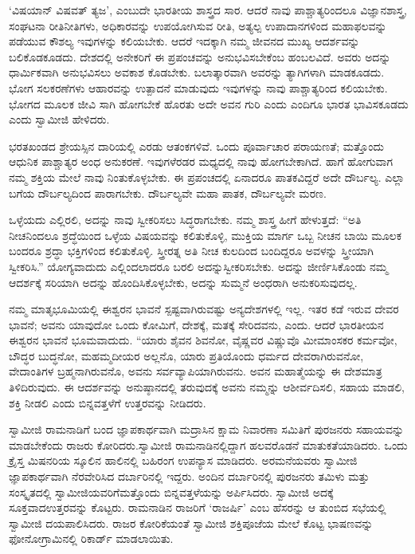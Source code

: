  ‘ವಿಷಯಾನ್ ವಿಷವತ್ ತ್ಯಜ’, ಎಂಬುದೇ ಭಾರತೀಯ ಶಾಸ್ತ್ರದ ಸಾರ. ಆದರೆ ನಾವು ಪಾಶ್ಚಾತ್ಯರಿಂದಲೂ ವಿಜ್ಞಾನಶಾಸ್ತ್ರ, ಸಂಘಟನಾ ರೀತಿನೀತಿಗಳು, ಅಧಿಕಾರವನ್ನು ಉಪಯೋಗಿಸುವ ರೀತಿ, ಅತ್ಯಲ್ಪ ಉಪಾದಾನಗಳಿಂದ ಮಹಾಫಲವನ್ನು ಪಡೆಯುವ ಕೌಶಲ್ಯ ಇವುಗಳನ್ನು ಕಲಿಯಬೇಕು. ಆದರೆ ಇದಕ್ಕಾಗಿ ನಮ್ಮ ಜೀವನದ ಮುಖ್ಯ ಆದರ್ಶವನ್ನು ಬಲಿಕೊಡಕೂಡದು. ದೇಶದಲ್ಲಿ ಅನೇಕರಿಗೆ ಈ ಪ್ರಪಂಚವನ್ನು ಅನುಭವಿಸಬೇಕೆಂಬ ಹಂಬಲವಿದೆ. ಅವರು ಅದನ್ನು ಧಾರ್ಮಿಕವಾಗಿ ಅನುಭವಿಸಲು ಅವಕಾಶ ಕೊಡಬೇಕು. ಬಲಾತ್ಕಾರವಾಗಿ ಅವರನ್ನು ತ್ಯಾಗಿಗಳಾಗಿ ಮಾಡಕೂಡದು. ಭೋಗ ಸಲಕರಣೆಗಳು ಆಹಾರವನ್ನು ಉತ್ಪಾದನೆ ಮಾಡುವುದು ಇವುಗಳನ್ನು ನಾವು ಪಾಶ್ಚಾತ್ಯರಿಂದ ಕಲಿಯಬೇಕು. ಭೋಗದ ಮೂಲಕ ಜೀವಿ ಸಾಗಿ ಹೋಗಬೇಕೆ ಹೊರತು ಅದೇ ಅವನ ಗುರಿ ಎಂದು ಎಂದಿಗೂ ಭಾರತ ಭಾವಿಸಕೂಡದು ಎಂದು ಸ್ವಾಮೀಜಿ ಹೇಳಿದರು. 

 ಭರತಖಂಡದ ಶ್ರೇಯಸ್ಸಿನ ದಾರಿಯಲ್ಲಿ ಎರಡು ಆತಂಕಗಳಿವೆ. ಒಂದು ಪೂರ್ವಾಚಾರ ಪರಾಯಣತೆ; ಮತ್ತೊಂದು ಆಧುನಿಕ ಪಾಶ್ಚಾತ್ಯರ ಅಂಧ ಅನುಕರಣೆ. ಇವುಗಳೆರಡರ ಮಧ್ಯದಲ್ಲಿ ನಾವು ಹೋಗಬೇಕಾಗಿದೆ. ಹಾಗೆ ಹೋಗುವಾಗ ನಮ್ಮ ಶಕ್ತಿಯ ಮೇಲೆ ನಾವು ನಿಂತುಕೊಳ್ಳಬೇಕು. ಈ ಪ್ರಪಂಚದಲ್ಲಿ ಏನಾದರೂ ಪಾತಕವಿದ್ದರೆ ಅದೇ ದೌರ್ಬಲ್ಯ. ಎಲ್ಲಾ ಬಗೆಯ ದೌರ್ಬಲ್ಯದಿಂದ ಪಾರಾಗಬೇಕು. ದೌರ್ಬಲ್ಯವೇ ಮಹಾ ಪಾತಕ, ದೌರ್ಬಲ್ಯವೇ ಮರಣ. 

 ಒಳ್ಳೆಯದು ಎಲ್ಲಿರಲಿ, ಅದನ್ನು ನಾವು ಸ್ವೀಕರಿಸಲು ಸಿದ್ಧರಾಗಬೇಕು. ನಮ್ಮ ಶಾಸ್ತ್ರ ಹೀಗೆ ಹೇಳುತ್ತದೆ: “ಅತಿ ನೀಚನಿಂದಲೂ ಶ್ರದ್ಧೆಯಿಂದ ಒಳ್ಳೆಯ ವಿಷಯವನ್ನು ಕಲಿತುಕೊಳ್ಳಿ, ಮುಕ್ತಿಯ ಮಾರ್ಗ ಒಬ್ಬ ನೀಚನ ಬಾಯಿ ಮೂಲಕ ಬಂದರೂ ಶ್ರದ್ಧಾ ಭಕ್ತಿಗಳಿಂದ ಕಲಿತುಕೊಳ್ಳಿ. ಸ್ತ್ರೀರತ್ನ ಅತಿ ನೀಚ ಕುಲದಿಂದ ಬಂದಿದ್ದರೂ ಅವಳನ್ನು ಸ್ತ್ರೀಯಾಗಿ ಸ್ವೀಕರಿಸಿ.” ಯೋಗ್ಯವಾದುದು ಎಲ್ಲಿಂದಲಾದರೂ ಬರಲಿ ಅದನ್ನು\break ಸ್ವೀಕರಿಸಬೇಕು. ಅದನ್ನು ಜೀರ್ಣಿಸಿಕೊಂಡು ನಮ್ಮ ಆದರ್ಶಕ್ಕೆ ಸರಿಯಾಗಿ ಅದನ್ನು ಹೊಂದಿಸಿಕೊಳ್ಳಬೇಕು, ಅದನ್ನು ಸುಮ್ಮನೆ ಅಂಧರಾಗಿ ಅನುಕರಿಸುವುದಲ್ಲ. 

 ನಮ್ಮ ಮಾತೃಭೂಮಿಯಲ್ಲಿ ಈಶ್ವರನ ಭಾವನೆ ಸ್ಪಷ್ಟವಾಗಿರುವಷ್ಟು ಅನ್ಯದೇಶಗಳಲ್ಲಿ ಇಲ್ಲ. ಇತರ ಕಡೆ ಇರುವ ದೇವರ ಭಾವನೆ; ಅವನು ಯಾವುದೋ ಒಂದು ಕೋಮಿಗೆ, ದೇಶಕ್ಕೆ, ಮತಕ್ಕೆ ಸೇರಿದವನು, ಎಂದು. ಆದರೆ ಭಾರತೀಯನ ಈಶ್ವರನ ಭಾವನೆ ಭೂಮವಾದುದು. “ಯಾರು ಶೈವನ ಶಿವನೋ, ವೈಷ್ಣವರ ವಿಷ್ಣುವೊ ಮೀಮಾಂಸಕರ ಕರ್ಮವೋ, ಬೌದ್ಧರ ಬುದ್ಧನೋ, ಮಹಮ್ಮದೀಯರ ಅಲ್ಲನೊ, ಯಾರು ಪ್ರತಿಯೊಂದು ಧರ್ಮದ ದೇವರಾಗಿರುವನೋ, ವೇದಾಂತಿಗಳ ಬ್ರಹ್ಮನಾಗಿರುವನೊ, ಅವನು ಸರ್ವವ್ಯಾಪಿಯಾಗಿರುವನು. ಅವನ ಮಹಾತ್ಮೆಯನ್ನು ಈ ದೇಶಮಾತ್ರ ತಿಳಿದಿರುವುದು. ಈ ಆದರ್ಶವನ್ನು ಅನುಷ್ಠಾನದಲ್ಲಿ ತರುವುದಕ್ಕೆ ಅವನು ನಮ್ಮನ್ನು ಆಶೀರ್ವದಿಸಲಿ, ಸಹಾಯ ಮಾಡಲಿ, ಶಕ್ತಿ ನೀಡಲಿ ಎಂದು ಬಿನ್ನವತ್ತಳೆಗೆ ಉತ್ತರವನ್ನು ನೀಡಿದರು. 

 ಸ್ವಾಮೀಜಿ ರಾಮನಾಡಿಗೆ ಬಂದ ಜ್ಞಾಪಕಾರ್ಥವಾಗಿ ಮದ್ರಾಸಿನ ಕ್ಷಾಮ ನಿವಾರಣಾ ಸಮಿತಿಗೆ ಪುರಜನರು ಸಹಾಯವನ್ನು ಮಾಡಬೇಕೆಂದು ರಾಜರು ಕೋರಿದರು.\break ಸ್ವಾಮೀಜಿ ರಾಮನಾಡಿನಲ್ಲಿದ್ದಾಗ ಹಲವರೊಡನೆ ಮಾತುಕತೆಯಾಡಿದರು. ಒಂದು ಕ್ರೈಸ್ತ ಮಿಷನರಿಯ ಸ್ಕೂಲಿನ ಹಾಲಿನಲ್ಲಿ ಬಹಿರಂಗ ಉಪನ್ಯಾಸ ಮಾಡಿದರು. ಅರಮನೆಯವರು ಸ್ವಾಮೀಜಿ ಜ್ಞಾಪಕಾರ್ಥವಾಗಿ ನೆರವೇರಿಸಿದ ದರ್ಬಾರಿನಲ್ಲಿ ಇದ್ದರು. ಅಂದಿನ ದರ್ಬಾರಿನಲ್ಲಿ ಪುರಜನರು ತಮಿಳು ಮತ್ತು ಸಂಸ್ಕೃತದಲ್ಲಿ ಸ್ವಾಮೀಜಿಯವರಿಗೆ\break ಮತ್ತೊಂದು ಬಿನ್ನವತ್ತಳೆಯನ್ನು ಅರ್ಪಿಸಿದರು. ಸ್ವಾಮೀಜಿ ಅದಕ್ಕೆ ಸೂಕ್ತವಾದ\break ಉತ್ತರವನ್ನು ಕೊಟ್ಟರು. ರಾಮನಾಡಿನ ರಾಜರಿಗೆ ‘ರಾಜರ್ಷಿ’ ಎಂಬ ಹೆಸರನ್ನು ಆ ತುಂಬಿದ ಸಭೆಯಲ್ಲಿ ಸ್ವಾಮೀಜಿ ದಯಪಾಲಿಸಿದರು. ರಾಜರ ಕೋರಿಕೆಯಂತೆ ಸ್ವಾಮೀಜಿ ಶಕ್ತಿಪೂಜೆಯ ಮೇಲೆ ಕೊಟ್ಟ ಭಾಷಣವನ್ನು ಫೋನೋಗ್ರಾಮಿನಲ್ಲಿ ರಿಕಾರ್ಡ್ ಮಾಡಲಾಯಿತು. 

